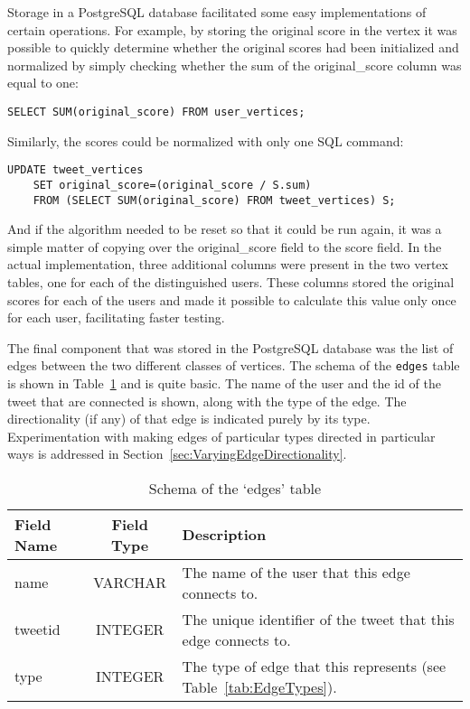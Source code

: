 Storage in a PostgreSQL database facilitated some easy implementations of certain operations. For example, by storing the original score in the vertex it was possible to quickly determine whether the original scores had been initialized and normalized by simply checking whether the sum of the original\_score column was equal to one:

\begin{verbatim}
SELECT SUM(original_score) FROM user_vertices;
\end{verbatim}

\noindent
Similarly, the scores could be normalized with only one SQL command:

\begin{verbatim}
UPDATE tweet_vertices
    SET original_score=(original_score / S.sum)
    FROM (SELECT SUM(original_score) FROM tweet_vertices) S;
\end{verbatim}

\noindent
And if the algorithm needed to be reset so that it could be run again, it was a simple matter of copying over the original\_score field to the score field. In the actual implementation, three additional columns were present in the two vertex tables, one for each of the distinguished users. These columns stored the original scores for each of the users and made it possible to calculate this value only once for each user, facilitating faster testing.

The final component that was stored in the PostgreSQL database was the list of edges between the two different classes of vertices. The schema of the \texttt{edges} table is shown in Table~\ref{tab:edgesSchema} and is quite basic. The name of the user and the id of the tweet that are connected is shown, along with the type of the edge. The directionality (if any) of that edge is indicated purely by its type. Experimentation with making edges of particular types directed in particular ways is addressed in Section~\ref{sec:VaryingEdgeDirectionality}.


\begin{table}
\centering
\begin{tabular}{l|c|p{8cm}}
{\bf Field Name} & {\bf Field Type} & {\bf Description} \\ \hline
name & VARCHAR & The name of the user that this edge connects to. \\ \hline
tweetid & INTEGER & The unique identifier of the tweet that this edge connects to. \\ \hline
type & INTEGER & The type of edge that this represents (see Table~\ref{tab:EdgeTypes}). \\
\end{tabular}
\caption{Schema of the `edges' table}
\label{tab:edgesSchema}
\end{table}

